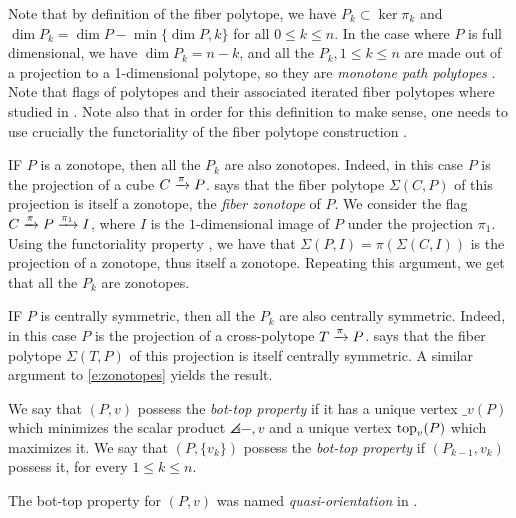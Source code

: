 Note that by definition of the fiber polytope, we have $P_k \subset \ker \pi_k$ and $\dim P_k = \dim P - \min\{ \dim P,k\}$ for all $0\leq k \leq n$.
In the case where $P$ is full dimensional, we have $\dim P_k = n-k$, and all the $P_k, 1 \leq k \leq n$ are made out of a projection to a 1-dimensional polytope, so they are \emph{monotone path polytopes} \cite[Theorem 5.3]{BilleraSturmfels92}.
Note that flags of polytopes and their associated iterated fiber polytopes where studied in \cite{BilleraSturmfels94}.
Note also that in order for this definition to make sense, one needs to use crucially the functoriality of the fiber polytope construction \cite[Lemma 2.3]{BilleraSturmfels92}.

\begin{example}
	\label{e:zonotopes}
	IF $P$ is a zonotope, then all the $P_k$ are also zonotopes. 
	Indeed, in this case $P$ is the projection of a cube $C \xrightarrow{\pi} P$.
	\cite[Theorem 4.1]{BilleraSturmfels92} says that the fiber polytope $\Sigma(C,P)$ of this projection is itself a zonotope, the \emph{fiber zonotope} of $P$. 
	We consider the flag $C \xrightarrow{\pi} P \xrightarrow{\pi_1} I$, where $I$ is the $1$-dimensional image of $P$ under the projection $\pi_1$. 
	Using the functoriality property \cite[Lemma 2.3]{BilleraSturmfels92}, we have that $\Sigma(P,I)=\pi(\Sigma(C,I))$ is the projection of a zonotope, thus itself a zonotope. 
	Repeating this argument, we get that all the $P_k$ are zonotopes. 
\end{example}

\begin{example}
	\label{e:centrally-symmetric}
	IF $P$ is centrally symmetric, then all the $P_k$ are also centrally symmetric. 
	Indeed, in this case $P$ is the projection of a cross-polytope $T \xrightarrow{\pi} P$.
	\cite[Theorem 5.1]{BilleraSturmfels92} says that the fiber polytope $\Sigma(T,P)$ of this projection is itself centrally symmetric.
	A similar argument to \cref{e:zonotopes} yields the result. 
\end{example}

\begin{definition}
	We say that $(P,v)$ possess the \emph{bot-top property} if it has a unique vertex $\bm_v(P)$ which minimizes the scalar product $\angles{-,v}$ and a unique vertex $\operatorname{top}_v(P)$ which maximizes it.
	We say that $(P,\{v_k\})$ possess the \emph{bot-top property} if $(P_{k-1}, v_k)$ possess it, for every $1\leq k \leq n$.
\end{definition}

The bot-top property for $(P,v)$ was named \emph{quasi-orientation} in \cite[Definition 1.11]{GLA21}.

